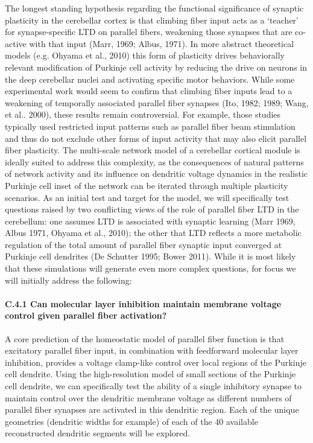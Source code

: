 \documentclass[12pt]{article}
\begin{document}
{\noindent The longest standing
hypothesis regarding the functional significance of synaptic
plasticity in the cerebellar cortex is that climbing fiber input acts
as a `teacher' for synapse-specific LTD on parallel fibers, weakening
those synapses that are co-active with that input (Marr,
1969; Albus, 1971). In more abstract theoretical models (e.g.  Ohyama
et al., 2010) this form of plasticity drives behaviorally relevant
modification of Purkinje cell activity by reducing the drive on
neurons in the deep cerebellar nuclei and activating specific motor
behaviors. While some experimental work would seem to confirm that
climbing fiber inputs lead to a weakening of temporally associated
parallel fiber synapses (Ito, 1982; 1989; Wang, et al.. 2000), these
results remain controversial. For example, those studies typically used
restricted input patterns such as parallel fiber beam stimulation and
thus do not exclude other forms of input activity that may also elicit
parallel fiber plasticity. The multi-scale network model of a
cerebellar cortical module is ideally suited to address this
complexity, as the consequences of natural patterns of network
activity and its influence on dendritic voltage dynamics in the
realistic Purkinje cell inset of the network can be iterated through
multiple plasticity scenarios. As an initial test and target for the
model, we will specifically test questions
raised by two conflicting views of the role of parallel
fiber LTD in the cerebellum: one assumes LTD is associated with
synaptic learning (Marr 1969, Albus 1971, Ohyama et al., 2010); the other that LTD reflects a more metabolic regulation of the total
amount of parallel fiber synaptic input converged at Purkinje cell
dendrites (De Schutter 1995; Bower 2011). While it is most likely that
these simulations will generate even more complex questions, for
focus we will initially address the following:

\paragraph{C.4.1 Can molecular layer inhibition maintain membrane voltage control given parallel fiber activation?} A core prediction of the homeostatic model of parallel fiber function is that excitatory parallel fiber input, in combination with feedforward molecular layer inhibition, provides a voltage clamp-like control over local regions of the Purkinje cell dendrite. Using the high-resolution model of small sections of the Purkinje cell dendrite, we can specifically test the ability of a single inhibitory synapse to maintain control over the dendritic membrane voltage as different numbers of parallel fiber synapses are activated in this dendritic region. Each of the unique geometries (dendritic widths for example) of each of the 40 available reconstructed dendritic segments will be explored.

}
\end{document}
